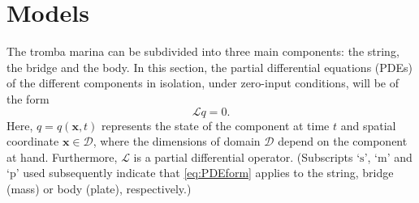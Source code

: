 \documentclass[dvipsnames, pdftex]{article}
\def\ugen{q}
\begin{document}
\section{Models}\label{sec:models}
The tromba marina can be subdivided into three main components: the string, the bridge and the body. In this section, the partial differential equations (PDEs) of the different components in isolation, under zero-input conditions, will be of the form
\begin{equation}\label{eq:PDEform}
    \mathcal{L}\ugen = 0.
\end{equation}
Here, $\ugen = \ugen(\boldsymbol{x},t)$ represents the state of the component at time $t$ and spatial coordinate $\boldsymbol{x}\in\mathcal{D}$, where the dimensions of domain $\mathcal{D}$ depend on the component at hand. Furthermore, $\mathcal{L}$ is a partial differential operator. (Subscripts `$\text{s}$', `$\text{m}$' and `$\text{p}$' used subsequently indicate that \eqref{eq:PDEform} applies to the string, bridge (mass) or body (plate), respectively.)
\end{document}
